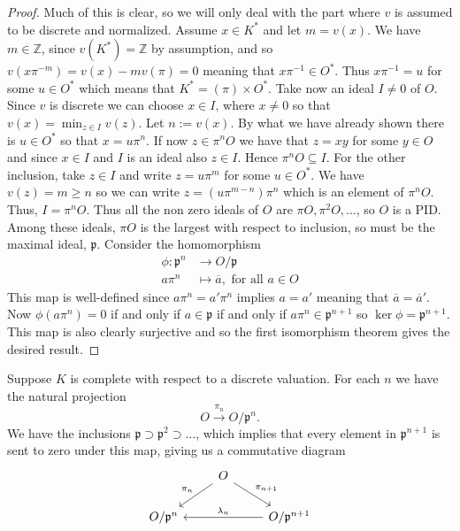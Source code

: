 \documentclass{article}
\newcommand{\mfrak}[1]{\mathfrak{#1}}
\newcommand{\mbb}[1]{\mathbb{#1}}
\begin{document}
\begin{proof}
    Much of this is clear, so we will only deal with the part where $v$ is assumed to be discrete and normalized. Assume $x \in K^*$ and let $m = v(x)$. We have $m \in \mbb Z$, since $v(K^*) = \mbb Z$ by assumption, and so $v(x \pi^{-m}) = v(x) - mv(\pi) = 0$ meaning that $x \pi^{-1} \in O^*$. Thus $x \pi^{-1} = u$ for some $u \in O^*$ which means that $K^* = (\pi) \times O^*$. Take now an ideal $I \neq 0$ of $O$. Since $v$ is discrete we can choose $x \in I$, where $x \neq 0$ so that $v(x) = \min_{z \in I}v(z)$. Let $n := v(x)$. By what we have already shown there is $u \in O^*$ so that $x = u\pi^n$. If now $z \in \pi^n O$ we have that $z = xy$ for some $y \in O$ and since $x \in I$ and $I$ is an ideal also $z \in I$. Hence $\pi^n O \subseteq I$. For the other inclusion, take $z \in I$ and write $z = u \pi^m$ for some $u \in O^*$. We have $v(z) = m \geq n$ so we can write $z = (u \pi^{m-n}) \pi^n$ which is an element of $\pi^n O$. Thus, $I = \pi^n O$. Thus all the non zero ideals of $O$ are $\pi O, \pi^2 O, ...$, so $O$ is a PID. Among these ideals, $\pi O$ is the largest with respect to inclusion, so must be the maximal ideal, $\mfrak p$. Consider the homomorphism 
    \begin{align*}
        \phi : \mfrak p^n &\to O / \mfrak p \\ 
        a \pi^n &\mapsto \overline a, \text{ for all } a \in O
    \end{align*}
    This map is well-defined since $a \pi^n = a' \pi^n$ implies $a = a'$ meaning that $\overline a = \overline a'$. Now $\phi(a \pi^n) = 0$ if and only if $a \in \mfrak p$ if and only if $a \pi^n \in \mfrak p^{n+1}$ so $\ker \phi = \mfrak p^{n+1}$. This map is also clearly surjective and so the first isomorphism theorem gives the desired result.
    
\end{proof}

Suppose $K$ is complete with respect to a discrete valuation. For each $n$ we have the natural projection 
$$O \xrightarrow{\pi_n} O / \mfrak p^n.$$ 
We have the inclusions $\mfrak p \supset \mfrak p^2 \supset ...$, which implies that every element in $\mfrak p^{n+1}$ is sent to zero under this map, giving us a commutative diagram
$$\begin{tikzcd}
    & O \arrow[ld, "\pi_{n}"'] \arrow[rd, "\pi_{n+1}"] & \\
    O / \mfrak p^{n} & & O / \mfrak p^{n+1} \arrow[ll, "\lambda_{n}"']
\end{tikzcd}$$
\end{document}
